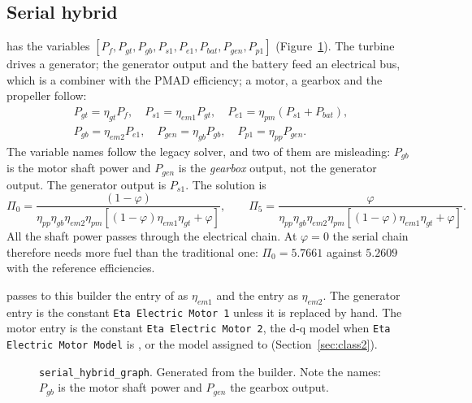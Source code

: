 \documentclass[a4paper,11pt]{article}
\begin{document}
\subsection{Serial hybrid}\label{sec:serial}
has the variables
$[P_f, P_{gt}, P_{gb}, P_{s1}, P_{e1}, P_{bat}, P_{gen}, P_{p1}]$ (Figure~\ref{fig:g-ser}).
The turbine drives a generator; the generator output and the battery feed an electrical bus,
which is a combiner with the PMAD efficiency; a motor, a gearbox and the propeller follow:
\begin{equation}
\begin{gathered}
  P_{gt} = \eta_{gt}P_f,\quad
  P_{s1} = \eta_{em1}P_{gt},\quad
  P_{e1} = \eta_{pm}(P_{s1} + P_{bat}),\\
  P_{gb} = \eta_{em2}P_{e1},\quad
  P_{gen} = \eta_{gb}P_{gb},\quad
  P_{p1} = \eta_{pp}P_{gen} .
\end{gathered}
\end{equation}
The variable names follow the legacy solver, and two of them are misleading: $P_{gb}$ is
the motor shaft power and $P_{gen}$ is the \emph{gearbox} output, not the generator output.
The generator output is $P_{s1}$. The solution is
\begin{equation}
  \Pi_0 = \frac{(1-\varphi)}{\eta_{pp}\eta_{gb}\eta_{em2}\eta_{pm}\left[(1-\varphi)\eta_{em1}\eta_{gt} + \varphi\right]},\qquad
  \Pi_5 = \frac{\varphi}{\eta_{pp}\eta_{gb}\eta_{em2}\eta_{pm}\left[(1-\varphi)\eta_{em1}\eta_{gt} + \varphi\right]} .
  \label{eq:ser}
\end{equation}
All the shaft power passes through the electrical chain. At $\varphi = 0$ the serial chain
therefore needs more fuel than the traditional one: $\Pi_0 = 5.7661$ against $5.2609$ with
the reference efficiencies.

 passes to this builder the  entry of
 as $\eta_{em1}$ and the  entry as
$\eta_{em2}$. The generator entry is the constant \texttt{Eta Electric Motor 1} unless it is
replaced by hand. The motor entry is the constant \texttt{Eta Electric Motor 2}, the d-q
model when \texttt{Eta Electric Motor Model} is , or the model assigned to
 (Section~\ref{sec:class2}).

\begin{figure}[htbp]
\centering

\caption{\texttt{serial\_hybrid\_graph}. Generated from the builder. Note the names: $P_{gb}$
is the motor shaft power and $P_{gen}$ the gearbox output.}\label{fig:g-ser}
\end{figure}
\end{document}
